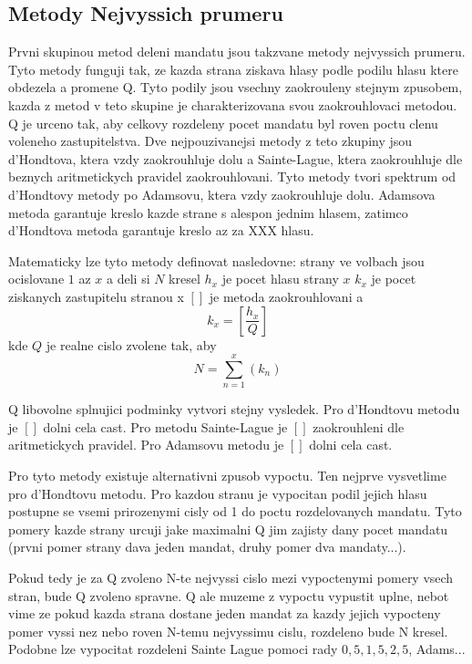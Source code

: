 \documentclass[12pt,a4paper]{report}
\begin{document}
\subsection{Metody Nejvyssich prumeru}
Prvni skupinou metod deleni mandatu jsou takzvane metody nejvyssich prumeru.
Tyto metody funguji tak, ze kazda strana ziskava hlasy podle podilu hlasu ktere obdezela a promene Q.
Tyto podily jsou vsechny zaokrouleny stejnym zpusobem, kazda z metod v teto skupine je charakterizovana svou zaokrouhlovaci metodou.
Q je urceno tak, aby celkovy rozdeleny pocet mandatu byl roven poctu clenu voleneho zastupitelstva.
Dve nejpouzivanejsi metody z teto zkupiny jsou d'Hondtova, ktera vzdy zaokrouhluje dolu a Sainte-Lague, ktera zaokrouhluje dle beznych aritmetickych pravidel zaokrouhlovani.
Tyto metody tvori spektrum od d'Hondtovy metody po Adamsovu, ktera vzdy zaokrouhluje dolu. %
Adamsova metoda garantuje kreslo kazde strane s alespon jednim hlasem, zatimco d'Hondtova metoda garantuje kreslo az za XXX hlasu.

Matematicky lze tyto metody definovat nasledovne:
strany ve volbach jsou ocislovane $1$ az $x$ a deli si $N$ kresel
$h_{x}$ je pocet hlasu strany $x$
$k_{x}$ je pocet ziskanych zastupitelu stranou x
$[]$ je metoda zaokrouhlovani
a
$$k_{x}=[\dfrac{h_{x}}{Q}]$$ kde $Q$ je realne cislo zvolene tak, aby $$N=\sum_{n=1}^{x} (k_{n})$$ 

Q libovolne splnujici podminky vytvori stejny vysledek. %
Pro d'Hondtovu metodu je $[ ]$ dolni cela cast.
Pro metodu Sainte-Lague je $[ ]$ zaokrouhleni dle aritmetickych pravidel.
Pro Adamsovu metodu je $[ ]$ dolni cela cast.

Pro tyto metody existuje alternativni zpusob vypoctu.
Ten nejprve vysvetlime pro d'Hondtovu metodu.
Pro kazdou stranu je vypocitan podil jejich hlasu postupne se vsemi prirozenymi cisly od 1 do poctu rozdelovanych mandatu.
Tyto pomery kazde strany urcuji jake maximalni Q jim zajisty dany pocet mandatu (prvni pomer strany dava jeden mandat, druhy pomer dva mandaty...).

Pokud tedy je za Q zvoleno N-te nejvyssi cislo mezi vypoctenymi pomery vsech stran, bude Q zvoleno spravne.
Q ale muzeme z vypoctu vypustit uplne, nebot vime ze pokud kazda strana dostane jeden mandat za kazdy jejich vypocteny pomer vyssi nez nebo roven N-temu nejvyssimu cislu, rozdeleno bude N kresel.
Podobne lze vypocitat rozdeleni Sainte Lague pomoci rady $0{,}5, 1{,}5, 2{,}5$, Adams... %
\end{document}
